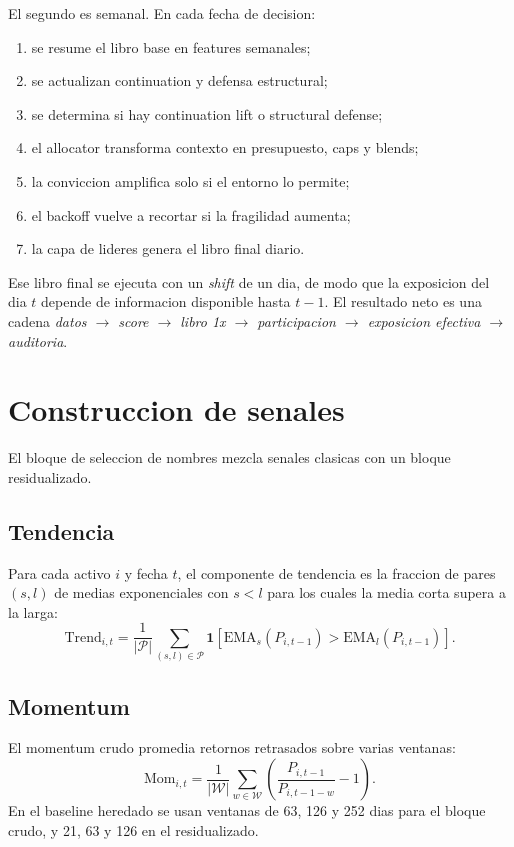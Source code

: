 \documentclass[11pt,letterpaper]{article}
\begin{document}
El segundo es semanal. En cada fecha de decision:

\begin{enumerate}
    \item se resume el libro base en features semanales;
    \item se actualizan continuation y defensa estructural;
    \item se determina si hay continuation lift o structural defense;
    \item el allocator transforma contexto en presupuesto, caps y blends;
    \item la conviccion amplifica solo si el entorno lo permite;
    \item el backoff vuelve a recortar si la fragilidad aumenta;
    \item la capa de lideres genera el libro final diario.
\end{enumerate}

Ese libro final se ejecuta con un \emph{shift} de un dia, de modo que la exposicion del dia \(t\) depende de informacion disponible hasta \(t-1\). El resultado neto es una cadena \emph{datos \(\rightarrow\) score \(\rightarrow\) libro 1x \(\rightarrow\) participacion \(\rightarrow\) exposicion efectiva \(\rightarrow\) auditoria}.

\section{Construccion de senales}
El bloque de seleccion de nombres mezcla senales clasicas con un bloque residualizado.

\subsection{Tendencia}
Para cada activo \(i\) y fecha \(t\), el componente de tendencia es la fraccion de pares \((s,l)\) de medias exponenciales con \(s<l\) para los cuales la media corta supera a la larga:
\begin{equation}
\mathrm{Trend}_{i,t}
= \frac{1}{|\mathcal{P}|}
\sum_{(s,l)\in \mathcal{P}}
\mathbf{1}\!\left[\mathrm{EMA}_{s}(P_{i,t-1}) > \mathrm{EMA}_{l}(P_{i,t-1})\right].
\end{equation}

\subsection{Momentum}
El momentum crudo promedia retornos retrasados sobre varias ventanas:
\begin{equation}
\mathrm{Mom}_{i,t}
= \frac{1}{|\mathcal{W}|}\sum_{w\in\mathcal{W}}
\left(\frac{P_{i,t-1}}{P_{i,t-1-w}} - 1\right).
\end{equation}
En el baseline heredado se usan ventanas de 63, 126 y 252 dias para el bloque crudo, y 21, 63 y 126 en el residualizado.
\end{document}
